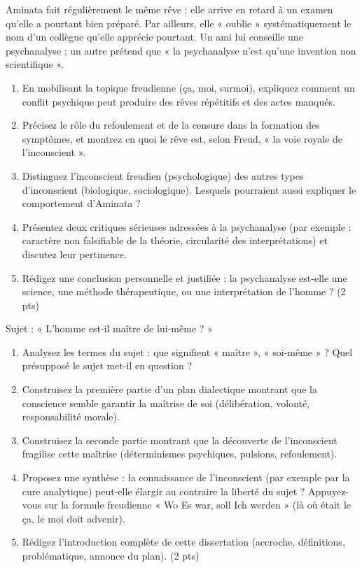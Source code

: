 \documentclass[11pt]{article}
\begin{document}
\begin{exercice}
Aminata fait régulièrement le même rêve : elle arrive en retard à un examen qu'elle a pourtant bien préparé. Par ailleurs, elle « oublie » systématiquement le nom d'un collègue qu'elle apprécie pourtant. Un ami lui conseille une psychanalyse ; un autre prétend que « la psychanalyse n'est qu'une invention non scientifique ».
\begin{enumerate}
\item En mobilisant la topique freudienne (ça, moi, surmoi), expliquez comment un conflit psychique peut produire des rêves répétitifs et des actes manqués.
\item Précisez le rôle du refoulement et de la censure dans la formation des symptômes, et montrez en quoi le rêve est, selon Freud, « la voie royale de l'inconscient ».
\item Distinguez l'inconscient freudien (psychologique) des autres types d'inconscient (biologique, sociologique). Lesquels pourraient aussi expliquer le comportement d'Aminata ?
\item Présentez deux critiques sérieuses adressées à la psychanalyse (par exemple : caractère non falsifiable de la théorie, circularité des interprétations) et discutez leur pertinence.
\item Rédigez une conclusion personnelle et justifiée : la psychanalyse est-elle une science, une méthode thérapeutique, ou une interprétation de l'homme ? (2 pts)
\end{enumerate}
\end{exercice}

\begin{exercice}
Sujet : « L'homme est-il maître de lui-même ? »
\begin{enumerate}
\item Analysez les termes du sujet : que signifient « maître », « soi-même » ? Quel présupposé le sujet met-il en question ?
\item Construisez la première partie d'un plan dialectique montrant que la conscience semble garantir la maîtrise de soi (délibération, volonté, responsabilité morale).
\item Construisez la seconde partie montrant que la découverte de l'inconscient fragilise cette maîtrise (déterminismes psychiques, pulsions, refoulement).
\item Proposez une synthèse : la connaissance de l'inconscient (par exemple par la cure analytique) peut-elle élargir au contraire la liberté du sujet ? Appuyez-vous sur la formule freudienne « Wo Es war, soll Ich werden » (là où était le ça, le moi doit advenir).
\item Rédigez l'introduction complète de cette dissertation (accroche, définitions, problématique, annonce du plan). (2 pts)
\end{enumerate}
\end{exercice}
\end{document}
